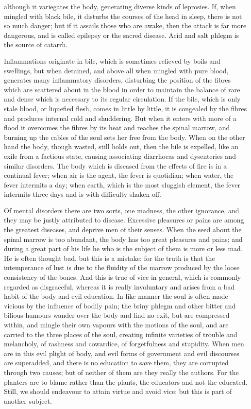 \documentclass[11pt,letter]{article}
\begin{document}
although it variegates the body, generating diverse kinds of leprosies. If, when mingled with black bile, it disturbs the courses of the head in sleep, there is not so much danger; but if it assails those who are awake, then the attack is far more dangerous, and is called epilepsy or the sacred disease. Acid and salt phlegm is the source of catarrh.

\par  Inflammations originate in bile, which is sometimes relieved by boils and swellings, but when detained, and above all when mingled with pure blood, generates many inflammatory disorders, disturbing the position of the fibres which are scattered about in the blood in order to maintain the balance of rare and dense which is necessary to its regular circulation. If the bile, which is only stale blood, or liquefied flesh, comes in little by little, it is congealed by the fibres and produces internal cold and shuddering. But when it enters with more of a flood it overcomes the fibres by its heat and reaches the spinal marrow, and burning up the cables of the soul sets her free from the body. When on the other hand the body, though wasted, still holds out, then the bile is expelled, like an exile from a factious state, causing associating diarrhoeas and dysenteries and similar disorders. The body which is diseased from the effects of fire is in a continual fever; when air is the agent, the fever is quotidian; when water, the fever intermits a day; when earth, which is the most sluggish element, the fever intermits three days and is with difficulty shaken off.

\par  Of mental disorders there are two sorts, one madness, the other ignorance, and they may be justly attributed to disease. Excessive pleasures or pains are among the greatest diseases, and deprive men of their senses. When the seed about the spinal marrow is too abundant, the body has too great pleasures and pains; and during a great part of his life he who is the subject of them is more or less mad. He is often thought bad, but this is a mistake; for the truth is that the intemperance of lust is due to the fluidity of the marrow produced by the loose consistency of the bones. And this is true of vice in general, which is commonly regarded as disgraceful, whereas it is really involuntary and arises from a bad habit of the body and evil education. In like manner the soul is often made vicious by the influence of bodily pain; the briny phlegm and other bitter and bilious humours wander over the body and find no exit, but are compressed within, and mingle their own vapours with the motions of the soul, and are carried to the three places of the soul, creating infinite varieties of trouble and melancholy, of rashness and cowardice, of forgetfulness and stupidity. When men are in this evil plight of body, and evil forms of government and evil discourses are superadded, and there is no education to save them, they are corrupted through two causes; but of neither of them are they really the authors. For the planters are to blame rather than the plants, the educators and not the educated. Still, we should endeavour to attain virtue and avoid vice; but this is part of another subject.
\end{document}
